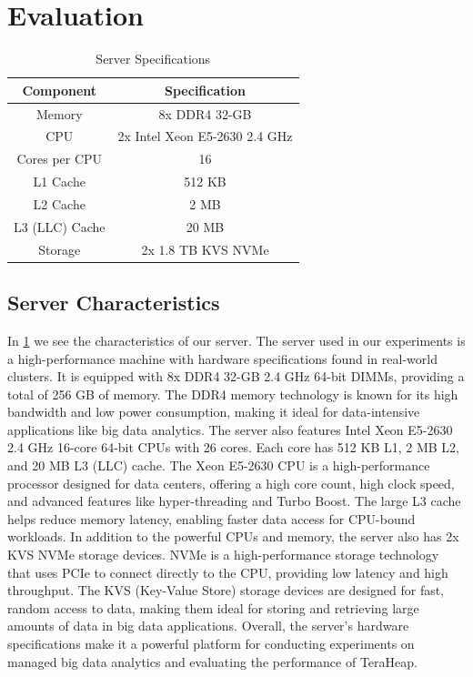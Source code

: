 \section{Evaluation}
\label{sec:eval}

\begin{table}[thbp]
  \centering
  \caption{Server Specifications}
  \label{tab:server-specs}
  \begin{tabular}{|c|c|}
    \hline
    \textbf{Component} & \textbf{Specification} \\
    \hline
    Memory & 8x DDR4 32-GB \\
    CPU & 2x Intel Xeon E5-2630 2.4 GHz \\
    Cores per CPU & 16 \\
    L1 Cache & 512 KB \\
    L2 Cache & 2 MB \\
    L3 (LLC) Cache & 20 MB \\
    Storage & 2x 1.8 TB KVS NVMe \\
    \hline
  \end{tabular}
\end{table}

\subsection{Server Characteristics}
In \ref{tab:server-specs} we see the characteristics of our server.
The server used in our experiments is a high-performance machine with
hardware specifications found in real-world clusters.
It is equipped with 8x DDR4 32-GB 2.4 GHz 64-bit DIMMs, providing a
total of 256 GB of memory. The DDR4 memory technology is known for its
high bandwidth and low power consumption, making it ideal for
data-intensive applications like big data analytics. The server also
features Intel Xeon E5-2630 2.4 GHz 16-core 64-bit CPUs with 26 cores. 
Each core has 512 KB L1, 2 MB L2, and 20 MB L3 (LLC) cache.
The Xeon E5-2630 CPU is a high-performance processor designed for data
centers, offering a high core count, high clock speed, and advanced
features like hyper-threading and Turbo Boost. The large L3 cache
helps reduce memory latency, enabling faster data access for CPU-bound
workloads. In addition to the powerful CPUs and memory, the server
also has 2x KVS NVMe storage devices. NVMe is a high-performance
storage technology that uses PCIe to connect directly to the CPU,
providing low latency and high throughput. The KVS (Key-Value Store)
storage devices are designed for fast, random access to data, making
them ideal for storing and retrieving large amounts of data in big
data applications. Overall, the server's hardware specifications make
it a powerful platform for conducting experiments on managed big data
analytics and evaluating the performance of TeraHeap.

